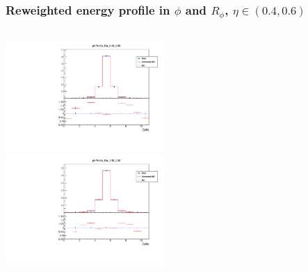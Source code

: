 \documentclass{beamer}
\begin{document}
\begin{frame}
\frametitle{Reweighted energy profile in $\phi$ and $R_\phi$,  $\eta \in (0.4, 0.6)$}

\begin{columns}[t]
\centering
\includegraphics[width=6cm]{phiProfile_Rew_Eta_4_6_Local_Rew.pdf}\\
\centering
\includegraphics[width=6cm]{phiProfile_Rew_Eta_18_20_Local_Rew.pdf}
\end{columns}
\end{frame}
\end{document}
